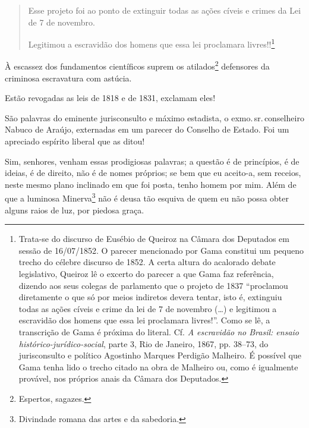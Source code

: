 \begin{quote}
Esse projeto foi ao ponto de extinguir todas as ações cíveis e crimes
da Lei de 7 de novembro.

Legitimou a escravidão dos homens que essa lei proclamara
livres!!\footnote{Trata-se do discurso de Eusébio de Queiroz na
  Câmara dos Deputados em sessão de 16/07/1852. O parecer mencionado por
  Gama constitui um pequeno trecho do célebre discurso de 1852. A certa
  altura do acalorado debate legislativo, Queiroz lê o excerto do
  parecer a que Gama faz referência, dizendo aos seus colegas de
  parlamento que o projeto de 1837 ``proclamou diretamente o que só por
  meios indiretos devera tentar, isto é, extinguiu todas as ações cíveis
  e crime da lei de 7 de novembro (\ldots{}) e legitimou a escravidão
  dos homens que essa lei proclamara livres!''. Como se lê, a transcrição
  de Gama é próxima do literal. Cf. \emph{A escravidão no Brasil: ensaio
  histórico-jurídico-social}, parte 3, Rio de Janeiro, 1867, pp. 38--73,
  do jurisconsulto e político Agostinho Marques Perdigão Malheiro. É
 possível que Gama tenha lido o trecho citado na obra de
  Malheiro ou, como é igualmente provável, nos próprios anais da Câmara
  dos Deputados.}
\end{quote}

À escassez dos fundamentos científicos suprem os atilados\footnote{
  Espertos, sagazes.} defensores da criminosa escravatura com astúcia.

Estão revogadas as leis de 1818 e de 1831, exclamam eles!

São palavras do eminente jurisconsulto e máximo estadista, o exmo.\,sr.\,conselheiro Nabuco de Araújo, externadas em um parecer do Conselho de
Estado. Foi um apreciado espírito liberal que as ditou!

Sim, senhores, venham essas prodigiosas palavras; a questão é de
princípios, é de ideias, é de direito, não é de nomes próprios; se bem
que eu aceito-a, sem receios, neste mesmo plano inclinado em que foi
posta, tenho homem por mim. Além de que a luminosa Minerva\footnote{
  Divindade romana das artes e da sabedoria.} não é deusa tão esquiva de
quem eu não possa obter alguns raios de luz, por piedosa graça.

